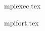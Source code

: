 
\newread\availtest
\openin\availtest mpiexec.tex
\ifeof\availtest
\else

\fi
\closein\availtest




\openin\availtest mpifort.tex
\ifeof\availtest
\else

\fi
\closein\availtest
